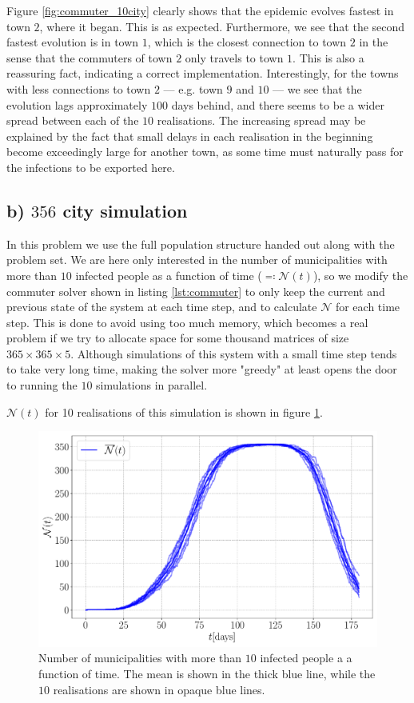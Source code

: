 Figure \ref{fig:commuter_10city} clearly shows that the epidemic evolves fastest in town $2$, where it began. This is as expected. Furthermore, we see that the second fastest evolution is in town $1$, which is the closest connection to town $2$ in the sense that the commuters of town $2$ only travels to town $1$. This is also a reassuring fact, indicating a correct implementation. Interestingly, for the towns with less connections to town $2$ --- e.g. town $9$ and $10$ --- we see that the evolution lags approximately $100$ days behind, and there seems to be a wider spread between each of the $10$ realisations. The increasing spread may be explained by the fact that small delays in each realisation in the beginning become exceedingly large for another town, as some time must naturally pass for the infections to be exported here.

\subsection{b) $356$ city simulation}

In this problem we use the full population structure handed out along with the problem set. We are here only interested in the number of municipalities with more than $10$ infected people as a function of time ($\eqqcolon \mathcal{N}(t)$), so we modify the commuter solver shown in listing \ref{lst:commuter} to only keep the current and previous state of the system at each time step, and to calculate $\mathcal{N}$ for each time step. This is done to avoid using too much memory, which becomes a real problem if we try to allocate space for some thousand matrices of size $365 \times 365 \times 5$. Although simulations of this system with a small time step tends to take very long time, making the solver more "greedy" at least opens the door to running the $10$ simulations in parallel. 

$\mathcal{N}(t)$ for 10 realisations of this simulation is shown in figure \ref{fig:infected_Eb}.  

\begin{figure}[htb]
	\centering
	\includegraphics[width=0.9\columnwidth]{../fig/2Eb_N.pdf}
	\caption{Number of municipalities with more than $10$ infected people a a function of time. The mean is shown in the thick blue line, while the $10$ realisations are shown in opaque blue lines.}
	\label{fig:infected_Eb}
\end{figure}

